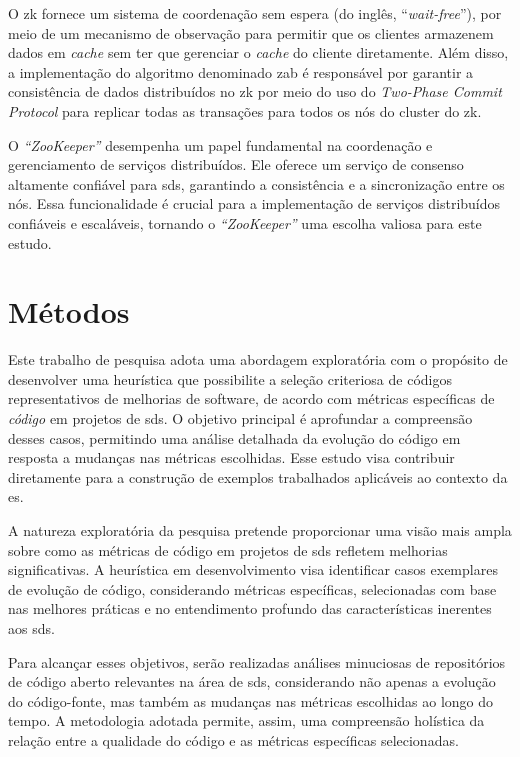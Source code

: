 O \gls{zk} fornece um sistema de coordenação sem espera (do inglês, ``\textit{wait-free}''), por meio de um mecanismo de observação para permitir que os clientes armazenem dados em \textit{cache} sem ter que gerenciar o \textit{cache} do cliente diretamente. Além disso, a implementação do algoritmo denominado \gls{zab} é responsável por garantir a consistência de dados distribuídos no \gls{zk} por meio do uso do \textit{Two-Phase Commit Protocol} para replicar todas as transações para todos os nós do cluster do \gls{zk}\cite{CloudKarafkaZAB}.

O \textit{``ZooKeeper''} desempenha um papel fundamental na coordenação e gerenciamento de serviços distribuídos. Ele oferece um serviço de consenso altamente confiável para \gls{sds}, garantindo a consistência e a sincronização entre os nós. Essa funcionalidade é crucial para a implementação de serviços distribuídos confiáveis e escaláveis, tornando o \textit{``ZooKeeper''} uma escolha valiosa para este estudo.

\section{Métodos}\label{sec:metodo}
Este trabalho de pesquisa adota uma abordagem exploratória com o propósito de desenvolver uma heurística que possibilite a seleção criteriosa de códigos representativos de melhorias de software, de acordo com métricas específicas de \textit{código} em projetos de \gls{sds}. O objetivo principal é aprofundar a compreensão desses casos, permitindo uma análise detalhada da evolução do código em resposta a mudanças nas métricas escolhidas. Esse estudo visa contribuir diretamente para a construção de exemplos trabalhados aplicáveis ao contexto da \gls{es}.

A natureza exploratória da pesquisa pretende proporcionar uma visão mais ampla sobre como as métricas de código em projetos de \gls{sds} refletem melhorias significativas. A heurística em desenvolvimento visa identificar casos exemplares de evolução de código, considerando métricas específicas, selecionadas com base nas melhores práticas e no entendimento profundo das características inerentes aos \gls{sds}.

Para alcançar esses objetivos, serão realizadas análises minuciosas de repositórios de código aberto relevantes na área de \gls{sds}, considerando não apenas a evolução do código-fonte, mas também as mudanças nas métricas escolhidas ao longo do tempo. A metodologia adotada permite, assim, uma compreensão holística da relação entre a qualidade do código e as métricas específicas selecionadas.

